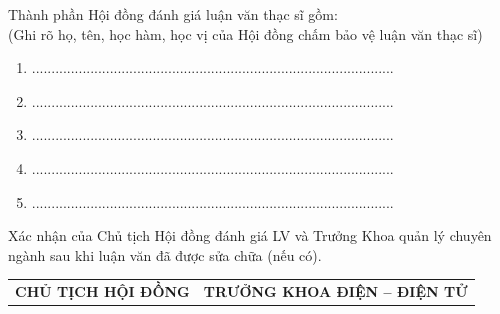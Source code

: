 {\fontsize{13}{15}\selectfont
Thành phần Hội đồng đánh giá luận văn thạc sĩ gồm:\\
(Ghi rõ họ, tên, học hàm, học vị của Hội đồng chấm bảo vệ luận văn thạc sĩ)\\
\begin{enumerate}[leftmargin=2cm]
\item .............................................................................................
\item .............................................................................................
\item .............................................................................................
\item .............................................................................................
\item .............................................................................................
\end{enumerate}
}

\vspace{1cm}

{\fontsize{13}{15}\selectfont
Xác nhận của Chủ tịch Hội đồng đánh giá LV và Trưởng Khoa quản lý chuyên ngành sau khi luận văn đã được sửa chữa (nếu có).\\
}

\begin{center}
\begin{tabular}{p{5cm}p{8cm}}
\centering\textbf{CHỦ TỊCH HỘI ĐỒNG} & \centering\textbf{TRƯỞNG KHOA ĐIỆN -- ĐIỆN TỬ}\tabularnewline
\end{tabular}
\end{center}

\clearpage
